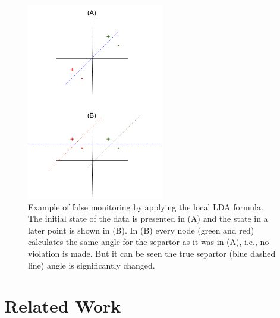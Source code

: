 \documentclass[11pt,twocolumn,varwidth=true,a4paper,fleqn]{article}
\begin{document}
\begin{figure}[h]
\centering
\includegraphics[width=60mm]{NegativeExample.png}
\caption{Example of false monitoring by applying the local LDA formula. The
initial state of the data is presented in (A) and the state in a later point
is shown in (B). In (B) every node (green and red) calculates the same angle
for the separtor  as it was in (A), i.e., no violation is made. But it can be
seen the true separtor (blue dashed line) angle is significantly changed.}
\label{NegativeExampl}

\end{figure}
\section{Related Work}
\end{document}
